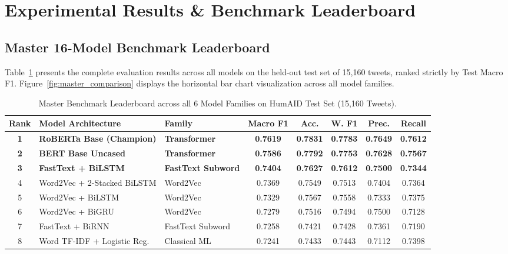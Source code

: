 \documentclass[12pt,a4paper]{article}
\begin{document}
\section{Experimental Results \& Benchmark Leaderboard}

\subsection{Master 16-Model Benchmark Leaderboard}
Table~\ref{tab:master_benchmark} presents the complete evaluation results across all models on the held-out test set of 15,160 tweets, ranked strictly by Test Macro F1. Figure~\ref{fig:master_comparison} displays the horizontal bar chart visualization across all model families.

\begin{table}[H]
    \centering
    \small
    \caption{Master Benchmark Leaderboard across all 6 Model Families on HumAID Test Set (15,160 Tweets).}
    \label{tab:master_benchmark}
    \begin{tabular*}{\textwidth}{@{\extracolsep{\fill}}cllccccc@{}}
        \toprule
        \textbf{Rank} & \textbf{Model Architecture} & \textbf{Family} & \textbf{Macro F1} & \textbf{Acc.} & \textbf{W. F1} & \textbf{Prec.} & \textbf{Recall} \\
        \midrule
        \textbf{1} & \textbf{RoBERTa Base (Champion)} & \textbf{Transformer} & \textbf{0.7619} & \textbf{0.7831} & \textbf{0.7783} & \textbf{0.7649} & \textbf{0.7612} \\
        \textbf{2} & \textbf{BERT Base Uncased} & \textbf{Transformer} & \textbf{0.7586} & \textbf{0.7792} & \textbf{0.7753} & \textbf{0.7628} & \textbf{0.7567} \\
        \textbf{3} & \textbf{FastText + BiLSTM} & \textbf{FastText Subword} & \textbf{0.7404} & \textbf{0.7627} & \textbf{0.7612} & \textbf{0.7500} & \textbf{0.7344} \\
        4 & Word2Vec + 2-Stacked BiLSTM & Word2Vec & 0.7369 & 0.7549 & 0.7513 & 0.7404 & 0.7364 \\
        5 & Word2Vec + BiLSTM & Word2Vec & 0.7329 & 0.7567 & 0.7558 & 0.7333 & 0.7375 \\
        6 & Word2Vec + BiGRU & Word2Vec & 0.7279 & 0.7516 & 0.7494 & 0.7500 & 0.7128 \\
        7 & FastText + BiRNN & FastText Subword & 0.7258 & 0.7421 & 0.7428 & 0.7361 & 0.7190 \\
        8 & Word TF-IDF + Logistic Reg. & Classical ML & 0.7241 & 0.7433 & 0.7443 & 0.7112 & 0.7398 \\

\end{tabular*}
\end{table}
\end{document}
